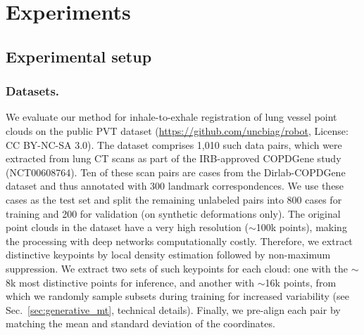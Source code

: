 \documentclass[runningheads]{llncs}
\begin{document}
\section{Experiments}
\subsection{Experimental setup}
\subsubsection{Datasets.}
We evaluate our method for inhale-to-exhale registration of lung vessel point clouds on the public PVT dataset \cite{shen2021accurate} (\url{https://github.com/uncbiag/robot}, License: CC BY-NC-SA 3.0).
The dataset comprises 1,010 such data pairs, which were extracted from lung CT scans as part of the IRB-approved COPDGene study (NCT00608764).
Ten of these scan pairs are cases from the Dirlab-COPDGene dataset \cite{castillo2013reference} and thus annotated with 300 landmark correspondences.
We use these cases as the test set and split the remaining unlabeled pairs into 800 cases for training and 200 for validation (on synthetic deformations only).
The original point clouds in the dataset have a very high resolution ($\sim$100k points), making the processing with deep networks computationally costly.
Therefore, we extract distinctive keypoints by local density estimation followed by non-maximum suppression.
We extract two sets of such keypoints for each cloud: one with the $\sim$8k most distinctive points for inference, and another with $\sim$16k points, from which we randomly sample subsets during training for increased variability (see Sec.~\ref{sec:generative_mt}, technical details).
Finally, we pre-align each pair by matching the mean and standard deviation of the coordinates.
\end{document}

